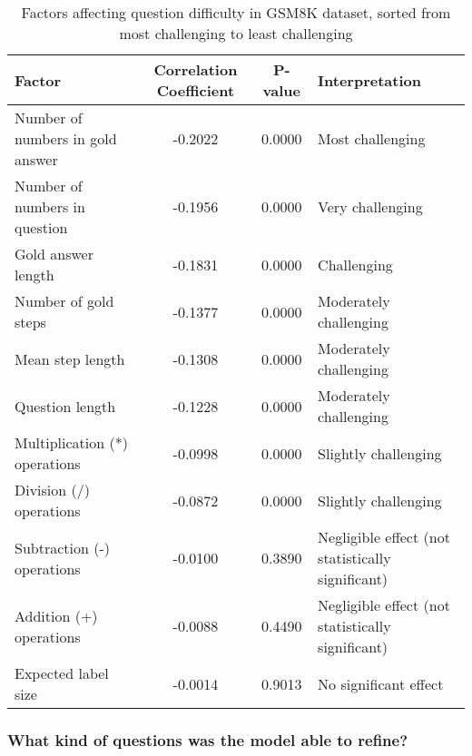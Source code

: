\documentclass[a4paper,10pt]{article}
\begin{document}
\begin{table}[htbp]
\centering
\setlength{\tabcolsep}{4pt}  %
\begin{tabular}{|l|c|c|p{4.5cm}|}
\hline
\textbf{Factor} & \textbf{Correlation Coefficient} & \textbf{P-value} & \textbf{Interpretation} \\
\hline
Number of numbers in gold answer & -0.2022 & 0.0000 & Most challenging \\
Number of numbers in question & -0.1956 & 0.0000 & Very challenging \\
Gold answer length & -0.1831 & 0.0000 & Challenging \\
Number of gold steps & -0.1377 & 0.0000 & Moderately challenging \\
Mean step length & -0.1308 & 0.0000 & Moderately challenging \\
Question length & -0.1228 & 0.0000 & Moderately challenging \\
Multiplication (*) operations & -0.0998 & 0.0000 & Slightly challenging \\
Division (/) operations & -0.0872 & 0.0000 & Slightly challenging \\
Subtraction (-) operations & -0.0100 & 0.3890 & Negligible effect (not statistically significant) \\
Addition (+) operations & -0.0088 & 0.4490 & Negligible effect (not statistically significant) \\
Expected label size & -0.0014 & 0.9013 & No significant effect \\
\hline
\end{tabular}
\caption{Factors affecting question difficulty in GSM8K dataset, sorted from most challenging to least challenging}
\label{tab:gsm8k_correlations}
\end{table}


\subsubsection{What kind of questions was the model able to refine?}
\end{document}
